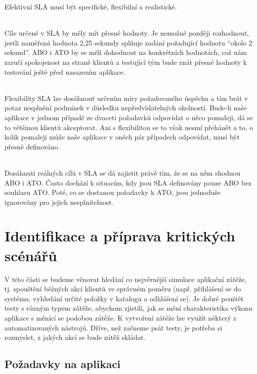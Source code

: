 \documentclass[122pt,oneside]{fithesis}
\begin{document}
Efektivní SLA musí být specifické, flexibilní a realistické.

\vspace{5 mm}
\\\indent Cíle určené v SLA by měly mít přesné hodnoty. Je nemožné později rozhodnout, jestli naměřená hodnota 2,25 sekundy splňuje zadání požadující hodnotu “okolo 2 sekund”. ABO i ATO by se měli dohodnout na konkrétních hodnotách, což nám zaručí spokojenost na straně klientů a testující tým bude znát přesné hodnoty k testování ještě před nasazením aplikace.

\vspace{5 mm}
\\\indent Flexibility SLA lze dosáhnout určením míry požadovaného úspěchu a tím brát v potaz nesplnění podmínek v důsledku nepředvídatelných okolností. Bude-li naše aplikace v jednom případě ze dvaceti požadavků odpovídat o něco pomaleji, dá se to většinou klientů akceptovat. Ani s flexibilitou se to však nesmí přehánět a to, o kolik pomaleji může naše aplikace v oněch pár případech odpovídat, musí být přesně definováno.

\vspace{5 mm}
\\\indent Dosáhnutí reálných cílů v SLA se dá zajistit právě tím, že se na něm shodnou ABO i ATO. Často dochází k situacím, kdy jsou SLA definovány pouze ABO bez souhlasu ATO. Poté, co se dostanou požadavky k ATO, jsou jednoduše ignorovány pro jejich nesplnitelnost.


\section{Identifikace a příprava kritických scénářů}
V této části se budeme věnovat hledání co nejvěrnější simulace aplikační zátěže, tj. spouštění běžných akcí klientů ve správném poměru (např. přihlášení se do systému, vyhledání určité položky v katalogu a odhlášení se). Je dobré pouštět testy s různým typem zátěže, abychom zjistili, jak se mění charakteristika výkonu aplikace s měnící se podobou zátěže. K vytvoření zátěže lze využít některý z automatizovaných nástrojů. Dříve, než začneme psát testy, je potřeba si rozmyslet, z jakých akcí se bude zátěž skládat.

\subsection{Požadavky na aplikaci}
\end{document}
